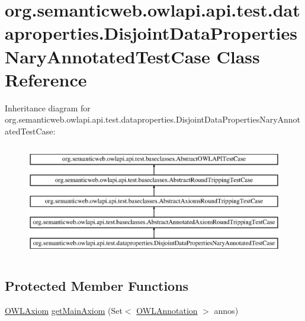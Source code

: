 \hypertarget{classorg_1_1semanticweb_1_1owlapi_1_1api_1_1test_1_1dataproperties_1_1_disjoint_data_properties_nary_annotated_test_case}{\section{org.\-semanticweb.\-owlapi.\-api.\-test.\-dataproperties.\-Disjoint\-Data\-Properties\-Nary\-Annotated\-Test\-Case Class Reference}
\label{classorg_1_1semanticweb_1_1owlapi_1_1api_1_1test_1_1dataproperties_1_1_disjoint_data_properties_nary_annotated_test_case}
}
Inheritance diagram for org.\-semanticweb.\-owlapi.\-api.\-test.\-dataproperties.\-Disjoint\-Data\-Properties\-Nary\-Annotated\-Test\-Case\-:\begin{figure}[H]
\begin{center}
\leavevmode
\includegraphics[height=5.000000cm]{classorg_1_1semanticweb_1_1owlapi_1_1api_1_1test_1_1dataproperties_1_1_disjoint_data_properties_nary_annotated_test_case}
\end{center}
\end{figure}
\subsection*{Protected Member Functions}
\begin{DoxyCompactItemize}
\item 
\hyperlink{interfaceorg_1_1semanticweb_1_1owlapi_1_1model_1_1_o_w_l_axiom}{O\-W\-L\-Axiom} \hyperlink{classorg_1_1semanticweb_1_1owlapi_1_1api_1_1test_1_1dataproperties_1_1_disjoint_data_properties_nary_annotated_test_case_a8bcadc75d9b881ce35ebe9192381a6fe}{get\-Main\-Axiom} (Set$<$ \hyperlink{interfaceorg_1_1semanticweb_1_1owlapi_1_1model_1_1_o_w_l_annotation}{O\-W\-L\-Annotation} $>$ annos)
\end{DoxyCompactItemize}
